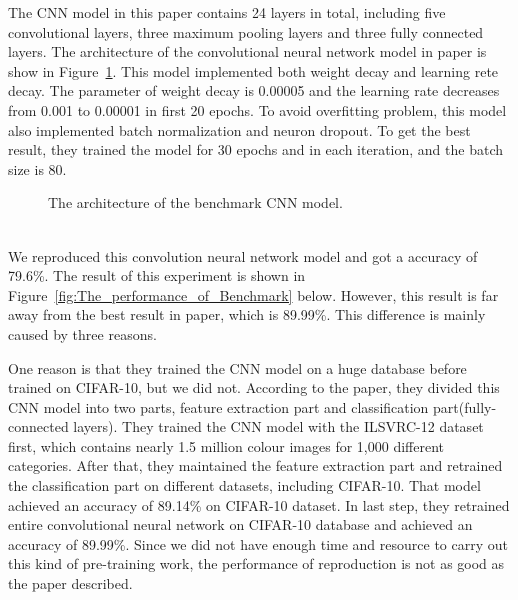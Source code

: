 \documentclass[]{UCD_CS_FYP_Report}
\begin{document}
The CNN model in this paper contains 24 layers in total, including five convolutional layers, three maximum pooling layers and three fully connected layers. The architecture of the convolutional neural network model in paper is show in Figure~\ref{fig:The_Architecture_of_Benchmark_model}. This model implemented both weight decay and learning rete decay. The parameter of weight decay is 0.00005 and the learning rate decreases from 0.001 to 0.00001 in first 20 epochs. To avoid overfitting problem, this model also implemented batch normalization and neuron dropout. To get the best result, they trained the model for 30 epochs and in each iteration, and the batch size is 80. 
\begin{figure}[h]
\centering
\fboxsep 2mm
\caption{\label{fig:The_Architecture_of_Benchmark_model} The architecture of the benchmark CNN model.}
\end{figure}
\\We reproduced this convolution neural network model and got a accuracy of 79.6\%. The result of this experiment is shown in Figure~\ref{fig:The_performance_of_Benchmark} below. However, this result is far away from the best result in paper, which is 89.99\%. This difference is mainly caused by three reasons. 

One reason is that they trained the CNN model on a huge database before trained on CIFAR-10, but we did not. According to the paper, they divided this CNN model into two parts, feature extraction part and classification part(fully-connected layers). They trained the CNN model with the ILSVRC-12 dataset first, which contains nearly 1.5 million colour images for 1,000 different categories. After that, they maintained the feature extraction part and retrained the classification part on different datasets, including CIFAR-10. That model achieved an accuracy of 89.14\% on CIFAR-10 dataset. In last step, they retrained entire convolutional neural network on CIFAR-10 database and achieved an accuracy of 89.99\%. Since we did not have enough time and resource to carry out this kind of pre-training work, the performance of reproduction is not as good as the paper described.
\end{document}
